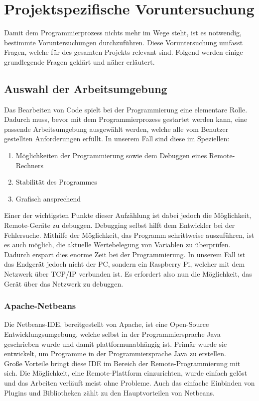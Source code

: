 \section{Projektspezifische Voruntersuchung}\label{sec:projektspezifische-voruntersuchung}
Damit dem Programmierprozess nichts mehr im Wege steht, ist es notwendig, bestimmte Voruntersuchungen durchzuführen.
Diese Voruntersuchung umfasst Fragen, welche für des gesamten Projekts relevant sind.
Folgend werden einige grundlegende Fragen geklärt und näher erläutert.
\subsection{Auswahl der Arbeitsumgebung}\label{subsec:auswahl-der-arbeitsumgebung}
Das Bearbeiten von Code spielt bei der Programmierung eine elementare Rolle.
Dadurch muss, bevor mit dem Programmierprozess gestartet werden kann, eine passende Arbeitsumgebung ausgewählt werden, welche alle vom Benutzer gestellten Anforderungen erfüllt.
In unserem Fall sind diese im Speziellen:
\begin{enumerate}
    \item Möglichkeiten der Programmierung sowie dem Debuggen eines Remote-Rechners
    \item Stabilität des Programmes
    \item Grafisch ansprechend
\end{enumerate}
Einer der wichtigsten Punkte dieser Aufzählung ist dabei jedoch die Möglichkeit, Remote-Geräte zu debuggen.
Debugging selbst hilft dem Entwickler bei der Fehlersuche.
Mithilfe der Möglichkeit, das Programm schrittweise auszuführen, ist es auch möglich, die aktuelle Wertebelegung von Variablen zu überprüfen.
Dadurch erspart dies enorme Zeit bei der Programmierung.
In unserem Fall ist das Endgerät jedoch nicht der \acs{PC}, sondern ein Raspberry Pi, welcher mit dem Netzwerk über \acs{TCP/IP} verbunden ist.
Es erfordert also nun die Möglichkeit, das Gerät über das Netzwerk zu debuggen.
\subsubsection{Apache-Netbeans}
Die Netbeans-\acs{IDE}, bereitgestellt von Apache, ist eine Open-Source Entwicklungsumgebung, welche selbst in der Programmiersprache Java geschrieben wurde und damit plattformunabhängig ist.
Primär wurde sie entwickelt, um Programme in der Programmiersprache Java zu erstellen.\\
Große Vorteile bringt diese IDE im Bereich der Remote-Programmierung mit sich.
Die Möglichkeit, eine Remote-Plattform einzurichten, wurde einfach gelöst und das Arbeiten verläuft meist ohne Probleme.
Auch das einfache Einbinden von Plugins und Bibliotheken zählt zu den Hauptvorteilen von Netbeans.
